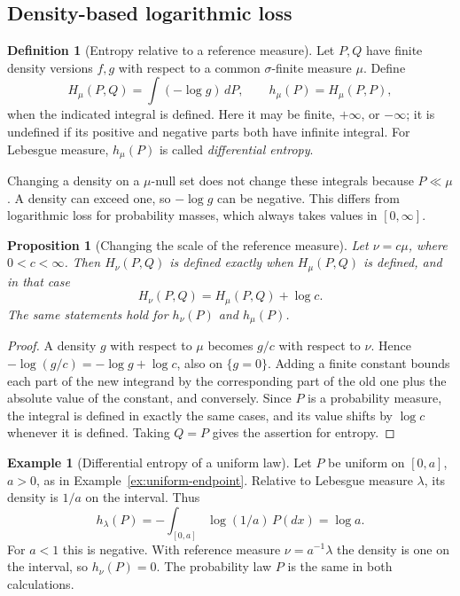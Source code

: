 \documentclass[11pt,oneside]{book}
\newtheorem{proposition}[theorem]{Proposition}
\theoremstyle{definition}
\newtheorem{definition}[theorem]{Definition}
\newtheorem{example}[theorem]{Example}
\theoremstyle{remark}
\begin{document}
\subsection{Density-based logarithmic loss}
\label{subsec:density-log-loss}

\begin{definition}[Entropy relative to a reference measure]
\label{def:density-entropy}
Let $P,Q$ have finite density versions $f,g$ with respect to a common
$\sigma$-finite measure $\mu$. Define
\[
H_\mu(P,Q)=\int(-\log g)\,dP,\qquad
h_\mu(P)=H_\mu(P,P),
\]
when the indicated integral is defined. Here it may be finite,
$+\infty$, or $-\infty$; it is undefined if its positive and negative
parts both have infinite integral. For Lebesgue measure,
$h_\mu(P)$ is called \emph{differential entropy}.
\end{definition}

Changing a density on a $\mu$-null set does not change these integrals
because $P\ll\mu$. A density can exceed one, so $-\log g$ can be negative.
This differs from logarithmic loss for probability masses, which
always takes values in $[0,\infty]$.

\begin{proposition}[Changing the scale of the reference measure]
\label{prop:rescale-entropy-reference}
Let $\nu=c\mu$, where $0<c<\infty$. Then $H_\nu(P,Q)$ is defined
exactly when $H_\mu(P,Q)$ is defined, and in that case
\[
H_\nu(P,Q)=H_\mu(P,Q)+\log c.
\]
The same statements hold for $h_\nu(P)$ and $h_\mu(P)$.
\end{proposition}
\begin{proof}
A density $g$ with respect to $\mu$ becomes $g/c$ with respect to $\nu$.
Hence $-\log(g/c)=-\log g+\log c$, also on $\{g=0\}$. Adding a
finite constant bounds each part of the new integrand by the
corresponding part of the old one plus the absolute value of the
constant, and conversely. Since $P$ is a
probability measure, the integral is defined in exactly the same
cases, and its value shifts by $\log c$ whenever it is defined.
Taking $Q=P$ gives the assertion for entropy.
\end{proof}

\begin{example}[Differential entropy of a uniform law]
\label{ex:uniform-differential-entropy}
Let $P$ be uniform on $[0,a]$, $a>0$, as in
Example~\ref{ex:uniform-endpoint}. Relative to Lebesgue measure
$\lambda$, its density is $1/a$ on the interval. Thus
\[
h_\lambda(P)=-\int_{[0,a]}\log(1/a)\,P(dx)=\log a.
\]
For $a<1$ this is negative. With reference measure
$\nu=a^{-1}\lambda$ the density is one on the interval, so
$h_\nu(P)=0$. The probability law $P$ is the same in both calculations.
\end{example}
\end{document}
